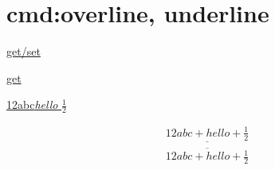 \documentclass{article}
\begin{document}
\section{cmd:overline, underline}

\underline{get/set}

\underline{get}

\underline{12abc{\it hello} $\frac12$}

\begin{align}
  \underline{12abc+\mathit{hello}+\frac12} \\
  \overline{12abc+\mathit{hello}+\frac12}
\end{align}
\end{document}

